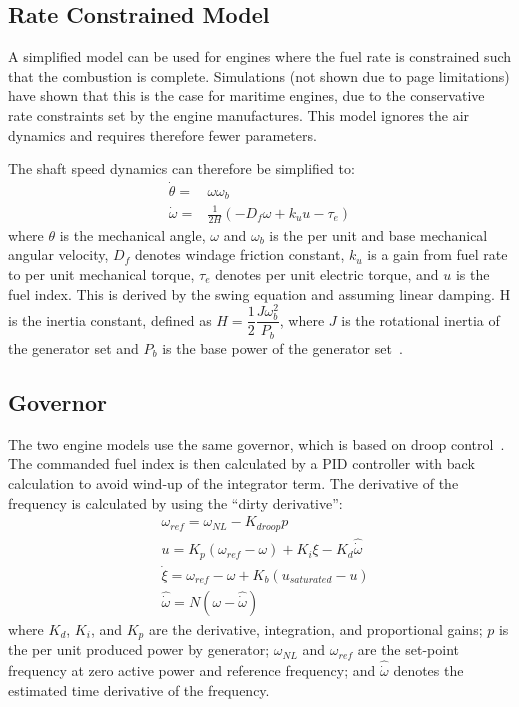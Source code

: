 \documentclass[twocolumn,10pt]{asme2e}
\begin{document}
\subsection*{Rate Constrained Model}
A simplified model can be used for engines where the fuel rate is constrained such that the combustion is complete.
Simulations (not shown due to page limitations) have shown that this is the case for maritime engines, due to the conservative rate constraints set by the engine manufactures.
This model ignores the air dynamics and requires therefore fewer parameters.

The shaft speed dynamics can therefore be simplified to:
\begin{align}
\dot{\theta} =& \omega \omega_b\\
\dot{\omega} =& \frac{1}{2H} \left(-D_f \omega + k_u u - \tau_e \right)
\end{align}
where $\theta$ is the mechanical angle, $\omega$ and $\omega_b$ is the per unit and base mechanical angular velocity, $D_f$ denotes windage friction constant, $k_u$ is a gain from fuel rate to per unit mechanical torque, $\tau_e$ denotes per unit electric torque, and $u$ is the fuel index.
This is derived by the swing equation and assuming linear damping.
H is the inertia constant, defined as
$
H = \dfrac{1}{2}\dfrac{J \omega_b^2}{P_b}
$,
where $J$ is the rotational inertia of the generator set and $P_b$ is the base power of the generator set~\cite{Krause2002}.

\subsection*{Governor}
The two engine models use the same governor, which is based on droop control~\cite{Woodward2004}.
The commanded fuel index is then calculated by a PID controller with back calculation to avoid wind-up of the integrator term.
The derivative of the frequency is calculated by using the ``dirty derivative'':
\begin{align}
&\omega_{ref} = \omega_{NL}-K_{droop}p \\
&u = K_p (\omega_{ref}-\omega)+K_i \xi - K_d \hat{\dot{\omega}}\\
&\dot{\xi} = \omega_{ref}-\omega + K_b(u_{saturated}-u)\\
&\hat{\dot{\omega}}= N(\omega-\hat{\dot{\omega}}) 
\end{align}
where $K_d$, $K_i$, and $K_p$ are the derivative, integration, and proportional gains; $p$ is the per unit produced power by generator; $\omega_{NL}$ and $\omega_{ref}$ are the set-point frequency at zero active power and reference frequency; and $\hat{\dot{\omega}}$ denotes the estimated time derivative of the frequency.
\end{document}
